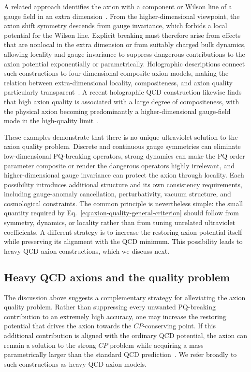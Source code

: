 \documentclass[review]{elsarticle}
\numberwithin{equation}{section}
\numberwithin{table}{section}
\numberwithin{figure}{section}
\begin{document}
A related approach identifies the axion with a component or Wilson line of a gauge field in an extra dimension~\cite{Choi:2003wr,Cox:2019rro}. From the higher-dimensional viewpoint, the axion shift symmetry descends from gauge invariance, which forbids a local potential for the Wilson line. Explicit breaking must therefore arise from effects that are nonlocal in the extra dimension or from suitably charged bulk dynamics, allowing locality and gauge invariance to suppress dangerous contributions to the axion potential exponentially or parametrically. Holographic descriptions connect such constructions to four-dimensional composite axion models, making the relation between extra-dimensional locality, compositeness, and axion quality particularly transparent~\cite{Cox:2019rro,Cox:2023dou}. A recent holographic QCD construction likewise finds that high axion quality is associated with a large degree of compositeness, with the physical axion becoming predominantly a higher-dimensional gauge-field mode in the high-quality limit~\cite{Csaki:2026qjl}.

These examples demonstrate that there is no unique ultraviolet solution to the axion quality problem. Discrete and continuous gauge symmetries can eliminate low-dimensional PQ-breaking operators, strong dynamics can make the PQ order parameter composite or render the dangerous operators highly irrelevant, and higher-dimensional gauge invariance can protect the axion through locality. Each possibility introduces additional structure and its own consistency requirements, including gauge-anomaly cancellation, perturbativity, vacuum structure, and cosmological constraints. The common principle is nevertheless simple: the small quantity required by Eq.~\eqref{eq:axion-quality-general-criterion} should follow from symmetry, dynamics, or locality rather than from tuning unrelated ultraviolet coefficients. A different strategy is to increase the restoring axion potential itself while preserving its alignment with the QCD minimum. This possibility leads to heavy QCD axion constructions, which we discuss next.

\subsection{Heavy QCD axions and the quality problem}
\label{sec:heavy-QCD-axions}

The discussion above suggests a complementary strategy for alleviating the axion quality problem. Rather than suppressing every unwanted PQ-breaking contribution to an extremely high accuracy, one may increase the restoring potential that drives the axion towards the $CP$-conserving point. If this additional contribution is aligned with the ordinary QCD potential, the axion can remain a solution to the strong $CP$ problem while acquiring a mass parametrically larger than the standard QCD prediction~\cite{Fukuda:2015ana,Agrawal:2017eqm,Agrawal:2017ksf,Gaillard:2018xgk,Hook:2019qoh,Gherghetta:2020ofz,Valenti:2022tsc}. We refer broadly to such constructions as heavy QCD axion models. 
\end{document}
